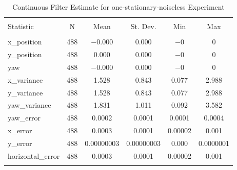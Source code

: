 
\begin{table}[h] \centering 
  \caption{Continuous Filter Estimate for one-stationary-noiseless Experiment} 
  \label{tab:one_stationary_noiseless_continuous_summary} 
\begin{tabular}{@{\extracolsep{5pt}}lccccc} 
\\[-1.8ex]\hline 
\hline \\[-1.8ex] 
Statistic & \multicolumn{1}{c}{N} & \multicolumn{1}{c}{Mean} & \multicolumn{1}{c}{St. Dev.} & \multicolumn{1}{c}{Min} & \multicolumn{1}{c}{Max} \\ 
\hline \\[-1.8ex] 
x\_position & 488 & $-$0.000 & 0.000 & $-$0 & 0 \\ 
y\_position & 488 & 0.000 & 0.000 & $-$0 & 0 \\ 
yaw & 488 & $-$0.000 & 0.000 & $-$0 & 0 \\ 
x\_variance & 488 & 1.528 & 0.843 & 0.077 & 2.988 \\ 
y\_variance & 488 & 1.528 & 0.843 & 0.077 & 2.988 \\ 
yaw\_variance & 488 & 1.831 & 1.011 & 0.092 & 3.582 \\ 
yaw\_error & 488 & 0.0002 & 0.0001 & 0.0001 & 0.0004 \\ 
x\_error & 488 & 0.0003 & 0.0001 & 0.00002 & 0.001 \\ 
y\_error & 488 & 0.00000003 & 0.00000003 & 0.000 & 0.0000001 \\ 
horizontal\_error & 488 & 0.0003 & 0.0001 & 0.00002 & 0.001 \\ 
\hline \\[-1.8ex] 
\end{tabular} 
\end{table} 
